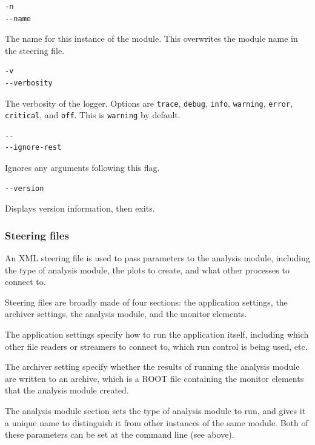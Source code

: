 \begin{lstlisting}
-n
--name
\end{lstlisting}

The name for this instance of the module. This overwrites the module name in the steering file.

\begin{lstlisting}
-v
--verbosity
\end{lstlisting}

The verbosity of the logger. Options are \texttt{trace}, \texttt{debug}, \texttt{info}, \texttt{warning}, \texttt{error}, \texttt{critical}, and \texttt{off}. This is \texttt{warning} by default.

\begin{lstlisting}
--
--ignore-rest
\end{lstlisting}

Ignores any arguments following this flag.

\begin{lstlisting}
--version
\end{lstlisting}

Displays version information, then exits.

\subsubsection{Steering files}
\label{section:steering-files}
An \acrshort{XML} steering file is used to pass parameters to the analysis module, including the type of analysis module, the plots to create, and what other processes to connect to. %

Steering files are broadly made of four sections: the application settings, the archiver settings, the analysis module, and the monitor elements.

The application settings specify how to run the application itself, including which other file readers or streamers to connect to, which run control is being used, etc. 

The archiver setting specify whether the results of running the analysis module are written to an archive, which is a ROOT file containing the monitor elements that the analysis module created.

The analysis module section sets the type of analysis module to run, and gives it a unique name to distinguish it from other instances of the same module. Both of these parameters can be set at the command line (see above).

